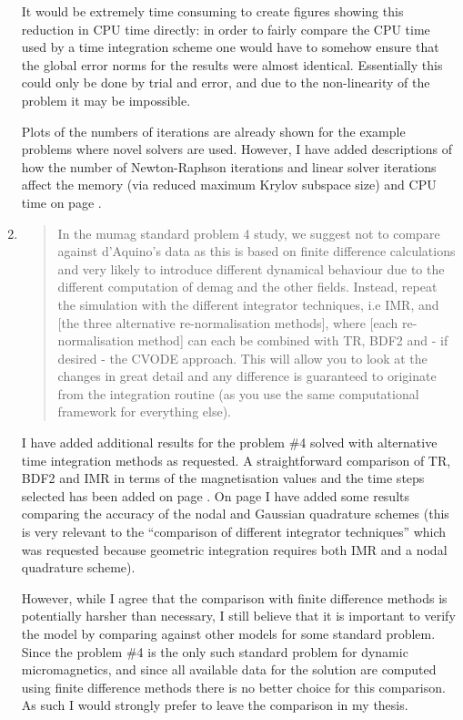 \documentclass[12pt,a4paper,pdftex]{article}
\begin{document}
\begin{enumerate}
It would be extremely time consuming to create figures showing this reduction in CPU time directly: in order to fairly compare the CPU time used by a time integration scheme one would have to somehow ensure that the global error norms for the results were almost identical.
Essentially this could only be done by trial and error, and due to the non-linearity of the problem it may be impossible.

  Plots of the numbers of iterations are already shown for the example problems where novel solvers are used.
However, I have added descriptions of how the number of Newton-Raphson iterations and linear solver iterations affect the memory (via reduced maximum Krylov subspace size) and CPU time on page \pageref{mem-cpu-solver-correction}.

\item
  \begin{quotation}
    In the mumag standard problem 4 study, we suggest not to compare
    against d'Aquino's data as this is based on finite difference
    calculations and very likely to introduce different dynamical behaviour
    due to the different computation of demag and the other fields.
    Instead, repeat the simulation with the different integrator
    techniques, i.e IMR, and [the three alternative re-normalisation
    methods], where [each re-normalisation method] can each be combined with
    TR, BDF2 and - if desired - the CVODE approach. This will allow you to
    look at the changes in great detail and any difference is guaranteed to
    originate from the integration routine (as you use the same
    computational framework for everything else).
  \end{quotation}
  I have added additional results for the \mumag problem \#4 solved with alternative time integration methods as requested.
  A straightforward comparison of TR, BDF2 and IMR in terms of the magnetisation values and the time steps selected has been added on page \pageref{more-mumag4-correction-1}.
  On page \pageref{more-mumag4-correction-2} I have added some results comparing the accuracy of the nodal and Gaussian quadrature schemes (this is very relevant to the ``comparison of different integrator techniques'' which was requested because geometric integration requires both IMR and a nodal quadrature scheme).

  However, while I agree that the comparison with finite difference methods is potentially harsher than necessary, I still believe that it is important to verify the model by comparing against other models for some standard problem.
  Since the \mumag problem \#4 is the only such standard problem for dynamic micromagnetics, and since all available data for the solution are computed using finite difference methods there is no better choice for this comparison.
  As such I would strongly prefer to leave the comparison in my thesis.


\end{enumerate}
\end{document}
